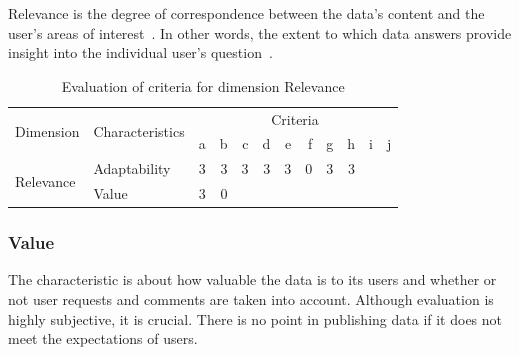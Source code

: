 Relevance is the degree of correspondence between the data's content and the user's areas of interest~\cite{stork-relevance}.
In other words, the extent to which data answers provide insight into the individual user's question~\cite{stork-relevance}.

\begin{table}[htbp]
    \centering

    \begin{tabular}{llrrrrrrrrrr}
        \toprule
        \multirow{2}{*}{Dimension}  & \multirow{2}{*}{Characteristics}  & \multicolumn{10}{c}{Criteria}         \\ \cmidrule(lr){3-12}
                                    &                                   & a & b & c & d & e & f & g & h & i & j \\ \midrule
        \multirow{2}{*}{Relevance}  & Adaptability                      & 3 & 3 & 3 & 3 & 3 & 0 & 3 & 3 &   &   \\
                                    & Value                             & 3 & 0 &   &   &   &   &   &   &   &   \\
        \bottomrule
    \end{tabular}

    \caption{Evaluation of criteria for dimension Relevance}
    \label{table:relevance-benchmark}
\end{table}
\FloatBarrier

\subsubsection{Value}

The characteristic is about how valuable the data is to its users and whether or not user requests and comments are taken into account.
Although evaluation is highly subjective, it is crucial.
There is no point in publishing data if it does not meet the expectations of users.


